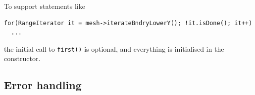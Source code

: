 \documentclass[12pt]{article}
\begin{document}
To support statements like
\begin{lstlisting}
for(RangeIterator it = mesh->iterateBndryLowerY(); !it.isDone(); it++)
  ...
\end{lstlisting}
the initial call to \lstinline!first()! is optional, and everything is initialised in the constructor.


\subsection{Error handling}






\printindex
\end{document}
